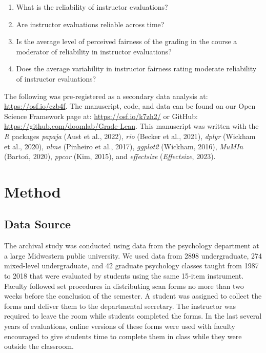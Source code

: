 \documentclass[
  man]{apa7}
\providecommand{\tightlist}{%
  \setlength{\itemsep}{0pt}\setlength{\parskip}{0pt}}
\begin{document}
\begin{enumerate}
\def\labelenumi{\arabic{enumi})}
\tightlist
\item
  What is the reliability of instructor evaluations?
\item
  Are instructor evaluations reliable across time?
\item
  Is the average level of perceived fairness of the grading in the
  course a moderator of reliability in instructor evaluations?
\item
  Does the average variability in instructor fairness rating moderate
  reliability of instructor evaluations?
\end{enumerate}

The following was pre-registered as a secondary data analysis at:
\url{https://osf.io/czb4f}. The manuscript, code, and data can be found on
our Open Science Framework page at: \url{https://osf.io/k7zh2/} or GitHub:
\url{https://github.com/doomlab/Grade-Lean}. This manuscript was written
with the \emph{R} packages \emph{papaja} (Aust et al., 2022), \emph{rio} (Becker et al., 2021), \emph{dplyr}
(Wickham et al., 2020), \emph{nlme} (Pinheiro et al., 2017), \emph{ggplot2} (Wickham, 2016), \emph{MuMIn}
(Bartoń, 2020), \emph{ppcor} (Kim, 2015), and \emph{effectsize} (\emph{Effectsize}, 2023).

\hypertarget{method}{%
\section{Method}\label{method}}

\hypertarget{data-source}{%
\subsection{Data Source}\label{data-source}}

The archival study was conducted using data from the psychology
department at a large Midwestern public university. We used data from
2898
undergraduate, 274
mixed-level undergraduate, and
42 graduate
psychology classes taught from 1987 to 2018 that were evaluated by
students using the same 15-item instrument. Faculty followed set
procedures in distributing scan forms no more than two weeks before the
conclusion of the semester. A student was assigned to collect the forms
and deliver them to the departmental secretary. The instructor was
required to leave the room while students completed the forms. In the
last several years of evaluations, online versions of these forms were
used with faculty encouraged to give students time to complete them in
class while they were outside the classroom.
\end{document}
